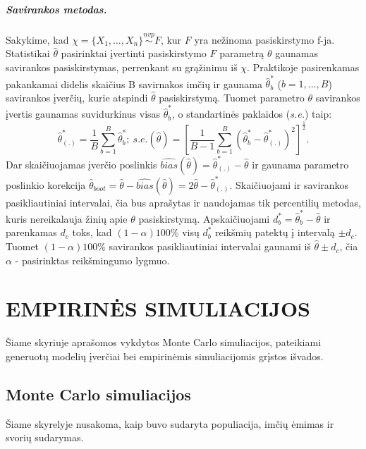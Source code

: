 \documentclass[12pt,a4paper]{article}
\begin{document}
\subparagraph{Savirankos metodas.} Sakykime, kad $\chi = \{X_1,\dots,X_n\}\stackrel{nvp}{\sim}F$, kur $F$ yra nežinoma pasiskirstymo f-ja. Statistikai $\hat{\theta}$ pasirinktai įvertinti pasiskirstymo $F$ parametrą $\theta$ gaunamas savirankos pasiskirstymas, perrenkant su grąžinimu iš $\chi$. Praktikoje pasirenkamas pakankamai didelis skaičius B savirnakos imčių ir gaunama $\hat{\theta}^*_b$ ($b=1,\dots,B$) savirankos įverčių, kurie atspindi $\hat{\theta}$ pasiskirstymą. Tuomet parametro $\theta$ savirankos įvertis gaunamas suvidurkinus visas $\hat{\theta}^*_b$, o standartinės paklaidos (\textit{s.e.}) taip:
\[
\hat{\theta}^*_{(.)}=\frac{1}{B}\sum^B_{b=1}\hat{\theta}^*_b; \
s.e.(\hat{\theta})=\left[\frac{1}{B-1}\sum^B_{b=1}(\hat{\theta}^*_b - \hat{\theta}^*_{(.)})^2\right]^{\frac{1}{2}}.
\]
Dar skaičiuojamas įverčio poslinkis $\widehat{bias}(\hat{\theta})=\hat{\theta}^*_{(.)}-\hat{\theta}$ ir gaunama parametro poslinkio korekcija $\hat{\theta}_{boot}=\hat{\theta}-\widehat{bias}(\hat{\theta})=2\hat{\theta}-\hat{\theta}^*_{(.)}$. Skaičiuojami ir savirankos pasikliautiniai intervalai, čia bus aprašytas ir naudojamas tik percentilių metodas, kuris nereikalauja žinių apie $\theta$ pasiskirstymą. Apskaičiuojami $d^*_b=\hat{\theta}^*_b-\hat{\theta}$ ir parenkamas $d_c$ toks, kad $(1-\alpha)100\%$ visų $d^*_b$ reikšmių patektų į intervalą $\pm d_c$. Tuomet $(1-\alpha)100\%$ savirankos pasikliautiniai intervalai gaunami iš $\hat{\theta}\pm d_c$, čia $\alpha$ - pasirinktas reikšmingumo lygmuo.




\newpage
\section{EMPIRINĖS SIMULIACIJOS} \label{sec:simul}
\indent Šiame skyriuje aprašomos vykdytos Monte Carlo simuliacijos, pateikiami generuotų modelių įverčiai bei empirinėmis simuliacijomis grįstos išvados.


\subsection{Monte Carlo simuliacijos}
\indent Šiame skyrelyje nusakoma, kaip buvo sudaryta populiacija, imčių ėmimas ir svorių sudarymas.
\end{document}
